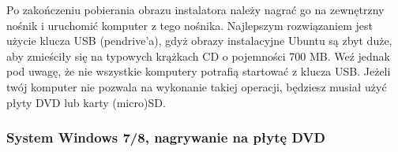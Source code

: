 \label{nagrywanie_obrazu} Po zakończeniu pobierania obrazu instalatora należy nagrać go na zewnętrzny nośnik i uruchomić komputer z tego nośnika. Najlepszym rozwiązaniem jest użycie klucza USB (pendrive'a), gdyż obrazy instalacyjne Ubuntu są zbyt duże, aby zmieściły się na typowych krążkach CD o pojemności 700 MB. Weź jednak pod uwagę, że nie wszystkie komputery potrafią startować z klucza USB. Jeżeli twój komputer nie pozwala na wykonanie takiej operacji, będziesz musiał użyć płyty DVD lub karty (micro)SD.

\subsubsection{System Windows 7/8, nagrywanie na płytę DVD}
\begin{figure}
	\vspace{-10pt}
\end{figure}
